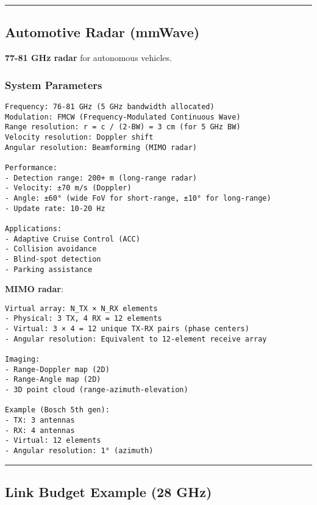 \begin{center}\rule{0.5\linewidth}{0.5pt}\end{center}

\subsection{\texorpdfstring{ Automotive Radar
(mmWave)}{ Automotive Radar (mmWave)}}\label{automotive-radar-mmwave}

\textbf{77-81 GHz radar} for autonomous vehicles.

\subsubsection{System Parameters}\label{system-parameters}

\begin{verbatim}
Frequency: 76-81 GHz (5 GHz bandwidth allocated)
Modulation: FMCW (Frequency-Modulated Continuous Wave)
Range resolution: r = c / (2·BW) = 3 cm (for 5 GHz BW)
Velocity resolution: Doppler shift
Angular resolution: Beamforming (MIMO radar)

Performance:
- Detection range: 200+ m (long-range radar)
- Velocity: ±70 m/s (Doppler)
- Angle: ±60° (wide FoV for short-range, ±10° for long-range)
- Update rate: 10-20 Hz

Applications:
- Adaptive Cruise Control (ACC)
- Collision avoidance
- Blind-spot detection
- Parking assistance
\end{verbatim}

\textbf{MIMO radar}:

\begin{verbatim}
Virtual array: N_TX × N_RX elements
- Physical: 3 TX, 4 RX = 12 elements
- Virtual: 3 × 4 = 12 unique TX-RX pairs (phase centers)
- Angular resolution: Equivalent to 12-element receive array

Imaging:
- Range-Doppler map (2D)
- Range-Angle map (2D)
- 3D point cloud (range-azimuth-elevation)

Example (Bosch 5th gen):
- TX: 3 antennas
- RX: 4 antennas
- Virtual: 12 elements
- Angular resolution: 1° (azimuth)
\end{verbatim}

\begin{center}\rule{0.5\linewidth}{0.5pt}\end{center}

\subsection{\texorpdfstring{ Link Budget Example (28
GHz)}{ Link Budget Example (28 GHz)}}\label{link-budget-example-28-ghz}

